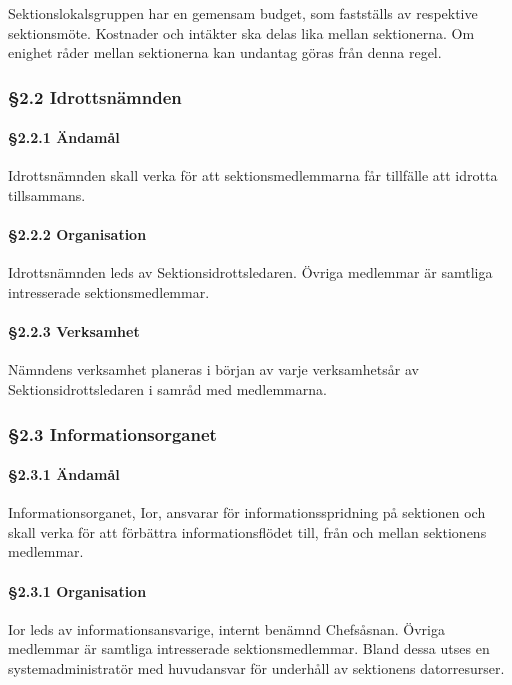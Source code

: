 Sektionslokalsgruppen har en gemensam budget, som fastställs av respektive sektionsmöte. Kostnader och intäkter ska delas lika mellan sektionerna. Om enighet råder mellan sektionerna kan undantag göras från denna regel.

\subsubsection{§2.2 Idrottsnämnden}

\paragraph{§2.2.1 Ändamål}

Idrottsnämnden skall verka för att sektionsmedlemmarna får tillfälle att idrotta tillsammans.

\paragraph{§2.2.2 Organisation}

Idrottsnämnden leds av Sektionsidrottsledaren. Övriga medlemmar är samtliga intresserade sektionsmedlemmar.

\paragraph{§2.2.3 Verksamhet}

Nämndens verksamhet planeras i början av varje verksamhetsår av Sektionsidrottsledaren i samråd med medlemmarna.

\subsubsection{§2.3 Informationsorganet}

\paragraph{§2.3.1 Ändamål}

Informationsorganet, Ior, ansvarar för informationsspridning på sektionen och skall verka för att förbättra informationsflödet till, från och mellan sektionens medlemmar.

\paragraph{§2.3.1 Organisation}

Ior leds av informationsansvarige, internt benämnd Chefsåsnan. Övriga medlemmar är samtliga intresserade sektionsmedlemmar. Bland dessa utses en systemadministratör med huvudansvar för underhåll av sektionens datorresurser.

